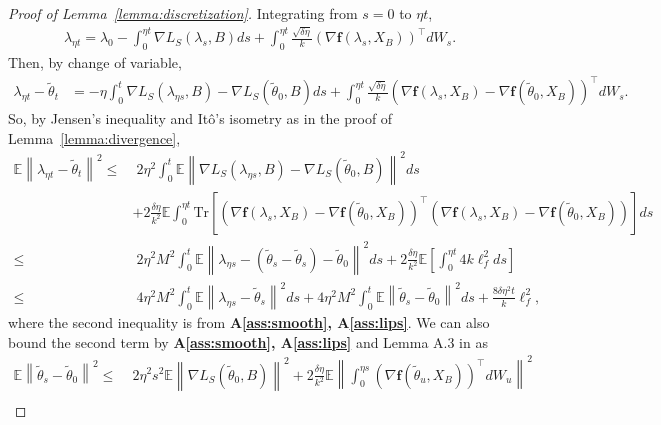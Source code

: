 \documentclass{article}
\newcommand{\norm}[1]{\left\lVert#1\right\rVert} %
\begin{document}
\begin{proof}[Proof of Lemma~\ref{lemma:discretization}]
	Integrating from $s=0$ to $\eta t$,
	\begin{align*}
		\lambda_{\eta t} = \lambda_0 - \int_0^{\eta t} \nabla L_S(\lambda_s, B) ds + \int_0^{\eta t}  \frac{\sqrt{\delta \eta}}{k} \left( \nabla \textbf{f}(\lambda_s, X_B)\right)^\top dW_s.
	\end{align*}
	Then, by change of variable, 
	\begin{align*}
		\lambda_{\eta t} - \tilde{\theta}_t&= - \eta \int_0^{t} \nabla L_S(\lambda_{\eta s}, B) - \nabla L_S(\tilde{\theta}_0, B) ds +\int_0^{\eta t}  \frac{\sqrt{\delta \eta}}{k} \left( \nabla \textbf{f}(\lambda_s, X_B) - \nabla \textbf{f}(\tilde{\theta}_0, X_B) \right)^\top dW_s.
	\end{align*}
	So, by Jensen's inequality and It\^o's isometry as in the proof of Lemma~\ref{lemma:divergence},
	\begin{align*}
		\mathbb{E}\norm{\lambda_{\eta t} - \tilde{\theta}_t}^2\leq& \; 2\eta^2 \int_0^{t} \mathbb{E}\norm{\nabla L_S(\lambda_{\eta s}, B) - \nabla L_S(\tilde{\theta}_0, B)}^2 ds\\
		&+ 2 \frac{\delta \eta}{k^2} \mathbb{E} \int_0^{\eta t}  \mathrm{Tr} \left[\left( \nabla \textbf{f}(\lambda_s, X_B) - \nabla \textbf{f}(\tilde{\theta}_0, X_B) \right)^\top \left( \nabla \textbf{f}(\lambda_s, X_B) - \nabla \textbf{f}(\tilde{\theta}_0, X_B) \right)\right] ds
		\\
		\leq&\; 2\eta^2 M^2 \int_0^{t} \mathbb{E}\norm{\lambda_{\eta s} - (\tilde{\theta}_s - \tilde{\theta}_s) - \tilde{\theta}_0}^2 ds +2 \frac{\delta \eta}{k^2} \mathbb{E}\left[ \int_0^{\eta t} 4 k \ell_f^2 ds\right]
		\\
		\leq&\;4 \eta^2 M^2 \int_0^{t} \mathbb{E}\norm{\lambda_{\eta s} - \tilde{\theta}_s}^2 ds + 4 \eta^2 M^2 \int_0^{t} \mathbb{E}\norm{\tilde{\theta}_s - \tilde{\theta}_0}^2 ds + \frac{8\delta \eta^2 t }{k} \ell_f^2,
	\end{align*}
	where the second inequality is from \textbf{A\ref{ass:smooth}, A\ref{ass:lips}}. We can also bound the second term by \textbf{A\ref{ass:smooth}, A\ref{ass:lips}} and Lemma A.3 in \citet{Farghly} as
	\begin{align*}
		\mathbb{E} \norm{\tilde{\theta}_s - \tilde{\theta}_0}^2 \leq&\; 2 \eta^2 s^2 \mathbb{E} \norm{\nabla L_S(\tilde{\theta}_0, B)}^2  +  2 \frac{\delta \eta}{k^2} \mathbb{E} \norm{\int_0^{\eta s}  \left( \nabla \textbf{f}(\tilde{\theta}_u, X_B)\right)^\top dW_{u}}^2 \\

\end{align*}
\end{proof}
\end{document}
